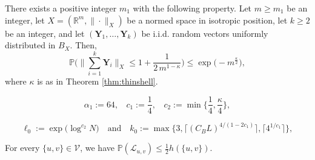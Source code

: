 \documentclass[10pt,a4paper]{amsart}
\begin{document}
\begin{lemma} \label{lem:prob_bound_2}
There exists a positive integer $m_1$ with the following property. Let $m\geqslant m_1$ be an integer, let $X=(\mathbb{R}^m,\|\cdot\|_X)$ be a normed space in isotropic position, let $k\geqslant 2$ be an integer, and let $(\mathbf{Y}_1,\dots,\mathbf{Y}_k)$ be i.i.d. random vectors uniformly distributed in $B_X$. Then,
\begin{equation} \label{eq3.4}
\mathbb{P} \Bigg( \Big\|  \sum_{i=1}^{k} \mathbf{Y}_i \Big\|_X \leqslant 1+\frac{1}{2\,m^{1-\kappa}} \Bigg)
\leqslant \exp\big(-m^{\frac{\kappa}{2}}\big),
\end{equation}
where $\kappa$ is as in Theorem \ref{thm:thinshell}.
\end{lemma}

\begin{equation} \label{eq:001}
\alpha_1:=64, \ \ \ \ c_1:=\frac{1}{4}, \ \ \ \ c_2:=\min\Big\{\frac{1}{4},\frac{\kappa}{4}\Big\},
\end{equation}

\begin{equation} \label{eq:009}
\ell_0 := \exp\big( \log^{c_2}N\big) \ \ \ \text{ and } \ \ \
k_0:= \max\Big\{ 3,\big\lceil (C_BL)^{4/(1-2c_1)}\big\rceil, \big\lceil 4^{1/c_1}\big\rceil \Big\},
\end{equation}

\begin{claim}\label{claim_Lovatz_condition}
For every $\{u,v\}\in\mathcal{V}$, we have $\mathbb{P}(\mathcal{L}_{u,v})\leqslant\frac{1}{2}h(\{u,v\})$.
\end{claim}
\end{document}
